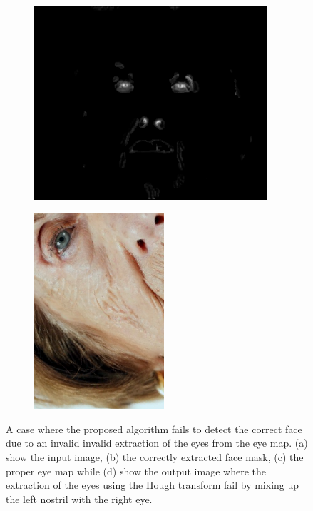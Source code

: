 \begin{figure}[H]
\begin{subfigure}{.25\textwidth}
  \includegraphics[width=0.95\textwidth]{img/fd3/fail1_finalEyeMap.png}
  \caption{}
\end{subfigure}%
\begin{subfigure}{.25\textwidth}
  \centering
  \includegraphics[width=0.53\textwidth]{img/fd3/fail1_output.png}
  \caption{}
\end{subfigure}%

\caption{A case where the proposed algorithm fails to detect the correct face due to an invalid invalid extraction of the eyes from the eye map. (a) show the input image, (b) the correctly extracted face mask, (c) the proper eye map while (d) show the output image where the extraction of the eyes using the Hough transform fail by mixing up the left nostril with the right eye. }
\label{fig:fail1}
\end{figure}


